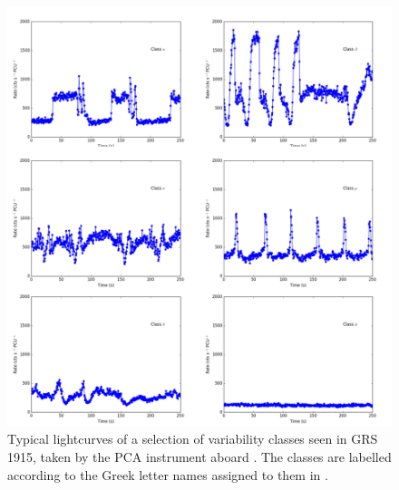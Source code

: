 \begin{figure}
  \centering
  \includegraphics[width=\linewidth, trim= 0mm 0mm 5mm 0mm, clip]{images/GRSsample.png}
  \caption[Typical lightcurves of a selection of variability classes seen in the LMXB GRS 1915+105.]{Typical lightcurves of a selection of variability classes seen in GRS 1915, taken by the PCA instrument aboard \rxte .  The classes are labelled according to the Greek letter names assigned to them in \citet{Belloni_GRS_MI}.}
  \label{fig:GRSsample}
\end{figure}

